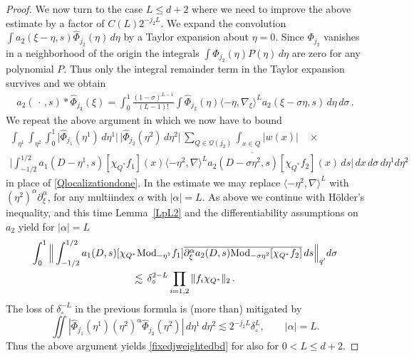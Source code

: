 \documentclass[11pt]{amsart}
\theoremstyle{definition}
\numberwithin{theorem}{section}
\numberwithin{definition}{section}
\def\Mod{\text{{\rm Mod}}}
\def\inn#1#2{\langle#1,#2\rangle}
\newcommand{\note}[1]{\footnote{\texttt{\Small #1}}}
\def\inn#1#2{\langle#1,#2\rangle}
\def\lc{\lesssim}
\def\cQ{{\mathcal {Q}}}
\begin{document}
\begin{proof}
We now turn to the case $L\le d+2$  where we need to improve the above estimate
by a factor
of $C(L) 2^{-j_2L}$.
We expand the convolution $\int
a_2(\xi-\eta,s)\widehat\Phi_{j_2}(\eta)\, d\eta$ by a Taylor
expansion about $\eta=0$. Since $\Phi_{j_2}$ vanishes in a
neighborhood of the origin the integrals $\int \widehat \Phi_{j_2}
(\eta) P(\eta)\, d\eta$ are zero for any polynomial $P$. Thus only
the integral remainder term in the Taylor expansion survives and we
obtain
\begin{align*}a_2(\,\cdot\,,s)*\widehat{\Phi}_{j_2}(\xi) =
\int_{0}^1 \frac{(1-\sigma)^{L-1}}{(L-1)!} \int \widehat{\Phi}_{j_2}
(\eta)\inn{-\eta}{\nabla_\xi}^L a_2(\xi-\sigma\eta,s)\, d\eta
\,d\sigma\,.
\end{align*}
We repeat the above argument in which we now  have
to bound
\begin{multline*}
\int_{\eta^1}\int_{\eta^2}\int_{0}^1
\big|\widehat \Phi_{j_1}(\eta^1)\,d\eta^1\big|\,
\big|\widehat \Phi_{j_2}(\eta^2)\,d\eta^2\big|\,
\sum_{Q\in \cQ(j_2)}\int_{x\in Q} |w(x)| \quad \times \\
\Big| \int_{-1/2}^{1/2}
 a_1(D-\eta^1,s)[\chi_{Q^*}f_1](x) \overline{ \inn{-\eta^2}{\nabla}^L
a_2(D-\sigma\eta^2,s)[\chi_{Q^*}f_2](x)} \,ds\Big| \,
dx \, d\sigma\,d\eta^1d\eta^2
\end{multline*}
in place of \eqref{Qlocalizationdone}.
In the estimate we may replace $\inn{-\eta^2}{\nabla}^L$  with
$ (\eta^2)^\alpha \partial_\xi^\alpha$, for any multiindex $\alpha$
with $|\alpha|=L$.
As above we continue with H\"older's inequality, and this time
Lemma~\ref{LpL2}  and the differentiability assumptions on $a_{2}$
yield for $|\alpha|=L$
\begin{multline*}
\int_{0}^1\Big\| \int_{-1/2}^{1/2}
a_1(D,s)[\chi_{Q^*}\Mod_{-\eta^1}f_1]
\overline{\partial_\xi^\alpha a_2(D,s)\Mod_{-\sigma\eta^2}[\chi_{Q^*}f_2]}\,ds
\Big\|_{q'}d\sigma
 \\ \lc\, \delta_\circ^{2 -L}
\prod_{i=1,2}\|f_i\chi_{Q^*}\|_2\,.
\end{multline*}
The  loss of $\delta_\circ^{-L}$  in the previous formula is
(more than)  mitigated by
$$
\iint |\widehat \Phi_{j_1}(\eta^1) (\eta^2)^{\alpha}\widehat {\Phi}_{j_2}(\eta^2)|
\,d\eta^1\,d\eta^2 \lc 2^{-j_2L} \delta_\circ^{L},\qquad |\alpha|=L.
$$
Thus  the above argument yields  \eqref{fixedjweightedbd} for also for $0<L\le d+2$.
\end{proof}
\end{document}
